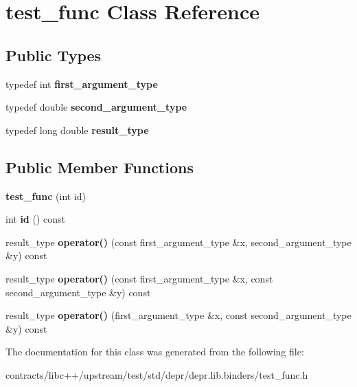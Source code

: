 \hypertarget{classtest__func}{}\section{test\+\_\+func Class Reference}
\label{classtest__func}
\subsection*{Public Types}
\begin{DoxyCompactItemize}
\item 
\mbox{\label{classtest__func_a4d6dba0164bd85ae2f81b966748dff91}} 
typedef int {\bfseries first\+\_\+argument\+\_\+type}
\item 
\mbox{\label{classtest__func_ad149055d14f3017810f499d20a5c1f5f}} 
typedef double {\bfseries second\+\_\+argument\+\_\+type}
\item 
\mbox{\label{classtest__func_a93010a2738d65b1c9b2a43c0f0a92b60}} 
typedef long double {\bfseries result\+\_\+type}
\end{DoxyCompactItemize}
\subsection*{Public Member Functions}
\begin{DoxyCompactItemize}
\item 
\mbox{\label{classtest__func_a5fce1a3c8d18f663c272749798b160c0}} 
{\bfseries test\+\_\+func} (int id)
\item 
\mbox{\label{classtest__func_a9f7ec3b97cf14aceb89ff16204fad967}} 
int {\bfseries id} () const
\item 
\mbox{\label{classtest__func_a979c8fb1a17a9676037eb07ba3097ad3}} 
result\+\_\+type {\bfseries operator()} (const first\+\_\+argument\+\_\+type \&x, second\+\_\+argument\+\_\+type \&y) const
\item 
\mbox{\label{classtest__func_ab1fad0d5d6bfaf840f12efe2778d3e3f}} 
result\+\_\+type {\bfseries operator()} (const first\+\_\+argument\+\_\+type \&x, const second\+\_\+argument\+\_\+type \&y) const
\item 
\mbox{\label{classtest__func_a584823ebb021d34e20f239ebedcdf7f0}} 
result\+\_\+type {\bfseries operator()} (first\+\_\+argument\+\_\+type \&x, const second\+\_\+argument\+\_\+type \&y) const
\end{DoxyCompactItemize}


The documentation for this class was generated from the following file\+:\begin{DoxyCompactItemize}
\item 
contracts/libc++/upstream/test/std/depr/depr.\+lib.\+binders/test\+\_\+func.\+h\end{DoxyCompactItemize}
